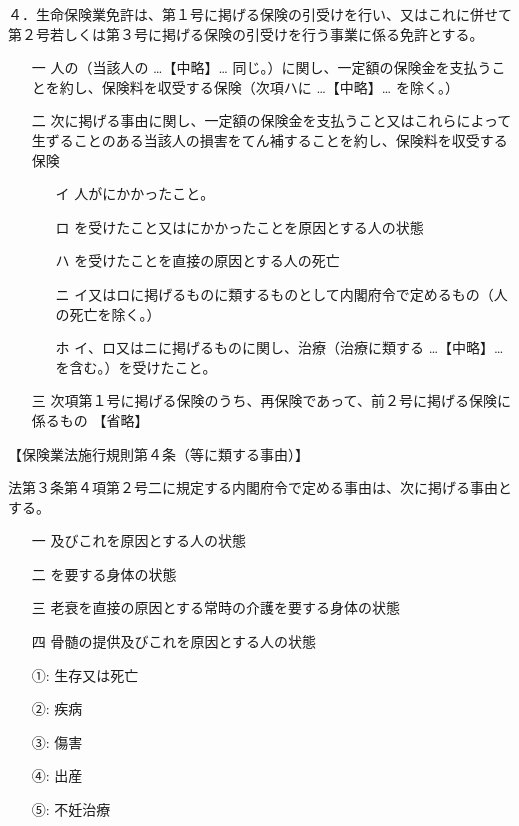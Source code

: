 \documentclass[report,gutter=10mm,fore-edge=10mm,uplatex,dvipdfmx]{jlreq}
\begin{document}
４．生命保険業免許は、第１号に掲げる保険の引受けを行い、又はこれに併せて第２号若しくは第３号に掲げる保険の引受けを行う事業に係る免許とする。
\begin{itemize}
\item[ 一 ] 人の（当該人の …【中略】… 同じ。）に関し、一定額の保険金を支払うことを約し、保険料を収受する保険（次項ハに …【中略】… を除く。）
\item[ 二 ] 次に掲げる事由に関し、一定額の保険金を支払うこと又はこれらによって生ずることのある当該人の損害をてん補することを約し、保険料を収受する保険
\begin{itemize}
\item[ イ ] 人がにかかったこと。
\item[ ロ ] を受けたこと又はにかかったことを原因とする人の状態
\item[ ハ ] を受けたことを直接の原因とする人の死亡
\item[ ニ ] イ又はロに掲げるものに類するものとして内閣府令で定めるもの（人の死亡を除く。）
\item[ ホ ] イ、ロ又はニに掲げるものに関し、治療（治療に類する …【中略】… を含む。）を受けたこと。
\end{itemize}
\item[ 三 ] 次項第１号に掲げる保険のうち、再保険であって、前２号に掲げる保険に係るもの
 【省略】
\end{itemize}

【保険業法施行規則第４条（等に類する事由）】

法第３条第４項第２号二に規定する内閣府令で定める事由は、次に掲げる事由とする。

\begin{itemize}
\item[ 一 ]  及びこれを原因とする人の状態
\item[ 二 ]  を要する身体の状態
\item[ 三 ]  老衰を直接の原因とする常時の介護を要する身体の状態
\item[ 四 ]  骨髄の提供及びこれを原因とする人の状態
\end{itemize}

\answer{}
\begin{itemize}
\item[ ①: ]  生存又は死亡
\item[ ②: ]  疾病
\item[ ③: ]  傷害
\item[ ④: ]  出産
\item[ ⑤: ]  不妊治療
\end{itemize}
\end{document}
